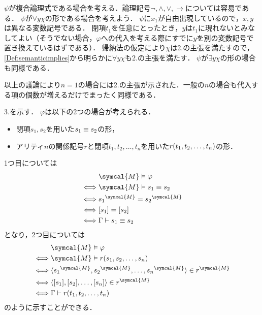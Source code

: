 \(\psi\)が複合論理式である場合を考える．論理記号\(\lnot, \land, \lor, \to\)については容易である．
\(\psi\)が\(\forall y \chi\)の形である場合を考えよう．
\(\psi\)に\(x_1\)が自由出現しているので，\(x, y\)は異なる変数記号である．
閉項\(t_1\)を任意にとったとき，\(y\)は\(t_1\)に現れないとみなしてよい（そうでない場合，\(\varphi\)への代入を考える際にすでに\(y\)を別の変数記号で置き換えているはずである）．
帰納法の仮定により\(\chi\)は2.の主張を満たすので，\cref{Def:semanticimplies}から明らかに\(\forall y \chi\)も2.の主張を満たす．
\(\psi\)が\(\exists y \chi\)の形の場合も同様である．

以上の議論により\(n = 1\)の場合には2.の主張が示された．一般の\(n\)の場合も代入する項の個数が増えるだけでまったく同様である．

3.を示す．
\(\varphi\)は以下の2つの場合が考えられる．
\begin{itemize}
	\item 閉項\(s_1, s_2\)を用いた\(s_1 \equiv s_2\)の形，
	\item アリティ\(n\)の関係記号\(r\)と閉項\(t_1, t_2, \dots, t_n\)を用いた\(\apply{r}{t_1, t_2, \dots, t_n}\)の形．
\end{itemize}
1つ目については
\begin{align*}
	                & \symcal{M} \satisfy \varphi                                         \\
	\metaequivalent & \symcal{M} \satisfy s_1 \objeq s_2                                  \\
	\metaequivalent & \interpretation{\symcal{M}}{s_1} = \interpretation{\symcal{M}}{s_2} \\
	\metaequivalent & \equivclass{s_1} = \equivclass{s_2}                                 \\
	\metaequivalent & \Gamma \provable s_1 \objeq s_2
\end{align*}
となり，2つ目については
\begin{align*}
	                & \symcal{M} \satisfy \varphi                         \\
	\metaequivalent & \symcal{M} \satisfy \apply{r}{s_1, s_2, \dots, s_n} \\
	\metaequivalent & \pair{
		\interpretation{\symcal{M}}{s_1}, \interpretation{\symcal{M}}{s_2}, \dots, \interpretation{\symcal{M}}{s_n}
	} \in \interpretation{\symcal{M}}{r}                                  \\
	\metaequivalent & \pair{
		\equivclass{s_1}, \equivclass{s_2}, \dots, \equivclass{s_n}
	} \in \interpretation{\symcal{M}}{r}                                  \\
	\metaequivalent & \Gamma \provable \apply{r}{t_1, t_2, \dots, t_n}
\end{align*}
のように示すことができる．

